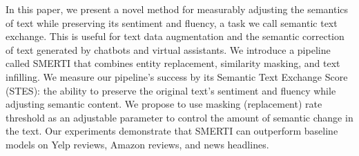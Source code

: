 In this paper, we present a novel method for measurably adjusting the semantics of text while preserving its sentiment and fluency, a task we call semantic text exchange. This is useful for text data augmentation and the semantic correction of text generated by chatbots and virtual assistants. We introduce a pipeline called SMERTI that combines entity replacement, similarity masking, and text infilling. We measure our pipeline's success by its Semantic Text Exchange Score (STES): the ability to preserve the original text's sentiment and fluency while adjusting semantic content. We propose to use masking (replacement) rate threshold as an adjustable parameter to control the amount of semantic change in the text. Our experiments demonstrate that SMERTI can outperform baseline models on Yelp reviews, Amazon reviews, and news headlines.